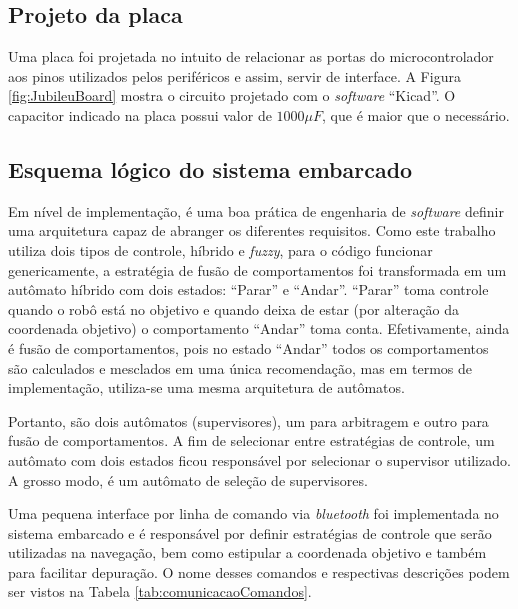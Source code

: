 	\subsection{Projeto da placa}
	
	Uma placa foi projetada no intuito de relacionar as portas do microcontrolador
	aos pinos utilizados pelos periféricos e assim, servir de interface. A Figura 
	\ref{fig:JubileuBoard} mostra o circuito projetado com o \textit{software} ``Kicad''. 
	O capacitor indicado na placa possui valor de $1000 \mu F$, que é maior que o necessário.
	
	
	
	\subsection{Esquema lógico do sistema embarcado}
	
	Em nível de implementação, é uma boa prática de engenharia de \textit{software} definir
	uma arquitetura capaz de abranger os diferentes requisitos. Como este trabalho utiliza 
	dois tipos de controle, híbrido e \textit{fuzzy}, para o código funcionar genericamente, 
	a estratégia de fusão de comportamentos foi transformada em um autômato híbrido com dois 
	estados: ``Parar'' e ``Andar''. ``Parar'' toma controle quando o robô está no objetivo e 
	quando deixa de estar (por alteração da coordenada objetivo) o comportamento ``Andar'' 
	toma conta. Efetivamente, ainda é fusão de comportamentos, pois no estado ``Andar'' todos 
	os comportamentos são calculados e mesclados em uma única recomendação, mas em termos de 
	implementação, utiliza-se uma mesma arquitetura de autômatos.
	
	Portanto, são dois autômatos (supervisores), um para arbitragem e outro para fusão de 
	comportamentos. A fim de selecionar entre estratégias de controle, um autômato com dois
	estados ficou responsável por selecionar o supervisor utilizado. A grosso modo, é um 
	autômato de seleção de supervisores. 
	
	Uma pequena interface por linha de comando via \textit{bluetooth} foi implementada no 
	sistema embarcado e é responsável por definir estratégias de controle que serão utilizadas 
	na navegação, bem como estipular a coordenada objetivo e também para facilitar depuração. 
	O nome desses comandos e respectivas descrições podem ser vistos na Tabela 
	\ref{tab:comunicacaoComandos}. 
	
	
	
